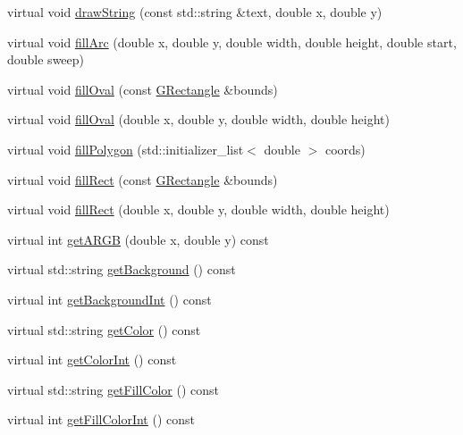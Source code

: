 \begin{DoxyCompactItemize}
\item 
virtual void \mbox{\hyperlink{classGDrawingSurface_ad4e8551a753a77135792bbee97013675}{draw\+String}} (const std\+::string \&text, double x, double y)
\item 
virtual void \mbox{\hyperlink{classGDrawingSurface_a228075ad18bd97b57f9956568c4773f3}{fill\+Arc}} (double x, double y, double width, double height, double start, double sweep)
\item 
virtual void \mbox{\hyperlink{classGDrawingSurface_a1ea6e48d59fb588797dba4deab1397e0}{fill\+Oval}} (const \mbox{\hyperlink{classGRectangle}{G\+Rectangle}} \&bounds)
\item 
virtual void \mbox{\hyperlink{classGDrawingSurface_a28c700c82f31cd328a4629273420ee61}{fill\+Oval}} (double x, double y, double width, double height)
\item 
virtual void \mbox{\hyperlink{classGDrawingSurface_a15f8c1c4409ef51c1a30a92a195b8f66}{fill\+Polygon}} (std\+::initializer\+\_\+list$<$ double $>$ coords)
\item 
virtual void \mbox{\hyperlink{classGDrawingSurface_ae6582295003bf2488836b1993dadbad7}{fill\+Rect}} (const \mbox{\hyperlink{classGRectangle}{G\+Rectangle}} \&bounds)
\item 
virtual void \mbox{\hyperlink{classGDrawingSurface_aac3ae7d3aee950de78eca0e108352254}{fill\+Rect}} (double x, double y, double width, double height)
\item 
virtual int \mbox{\hyperlink{classGDrawingSurface_ae394d39f20476570e083918d991c25bd}{get\+A\+R\+GB}} (double x, double y) const
\item 
virtual std\+::string \mbox{\hyperlink{classGDrawingSurface_a808e22cc1fdfbecf71ed8c64ef4600e0}{get\+Background}} () const
\item 
virtual int \mbox{\hyperlink{classGDrawingSurface_a9e827257a55cb8cf4d9de2ec6bcfd7a0}{get\+Background\+Int}} () const
\item 
virtual std\+::string \mbox{\hyperlink{classGDrawingSurface_aa061dfa488c31e18549d64363c1d0e34}{get\+Color}} () const
\item 
virtual int \mbox{\hyperlink{classGDrawingSurface_a9635c7af766cdc3417f346683fa0e6c1}{get\+Color\+Int}} () const
\item 
virtual std\+::string \mbox{\hyperlink{classGDrawingSurface_a76f6964a11fde7c78e9751be184e1a3c}{get\+Fill\+Color}} () const
\item 
virtual int \mbox{\hyperlink{classGDrawingSurface_a88f4508d9271c4b5f5b5d6b780f223d0}{get\+Fill\+Color\+Int}} () const

\end{DoxyCompactItemize}
